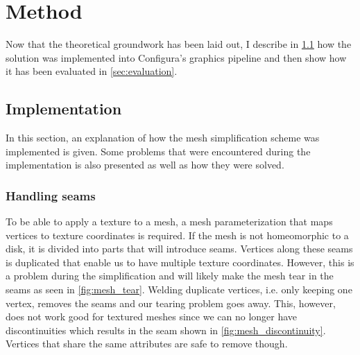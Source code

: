 

\chapter{Method} \label{cha:method}
  Now that the theoretical groundwork has been laid out, I describe in \cref{sec:implementation} how the solution was implemented into Configura's graphics pipeline and then show how it has been evaluated in \cref{sec:evaluation}.
  
\section{Implementation} \label{sec:implementation}
In this section, an explanation of how the mesh simplification scheme was implemented is given. Some problems that were encountered during the implementation is also presented as well as how they were solved.

\subsection{Handling seams}
To be able to apply a texture to a mesh, a mesh parameterization that maps vertices to texture coordinates is required. If the mesh is not homeomorphic to a disk, it is divided into parts that will introduce seams. Vertices along these seams is duplicated that enable us to have multiple texture coordinates. However, this is a problem during the simplification and will likely make the mesh tear in the seams as seen in \cref{fig:mesh_tear}. Welding duplicate vertices, i.e. only keeping one vertex, removes the seams and our tearing problem goes away. This, however, does not work good for textured meshes since we can no longer have discontinuities which results in the seam shown in \cref{fig:mesh_discontinuity}. Vertices that share the same attributes are safe to remove though.

